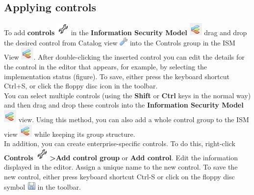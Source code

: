 \documentclass[a4paper,10pt]{book}
\begin{document}
\subsection{Applying controls}
To add \textbf{controls} \includegraphics[height=2ex]{Icon/Controls.png} in the \textbf{Information Security Model}
\includegraphics[height=2ex]{Icon/Informationssicherheitsmodell.png} drag and drop the desired control from Catalog view
\includegraphics[height=2ex]{Icon/Control_Kataloge.png} into the Controls group in the ISM View \includegraphics[height=2ex]{Icon/Informationssicherheitsmodell.png}.
After double-clicking the inserted control you can edit the details for the control in the editor that
appears, for example, by selecting the implementation status (figure). To save, either press the keyboard shortcut
Ctrl+S, or click the floppy disc icon in the toolbar.
\newline\\
You can select multiple controls (using the \textbf{Shift} or \textbf{Ctrl} keys in the normal way) and then drag and drop these controls into the
\textbf{Information Security Model} \includegraphics[height=2ex]{Icon/Informationssicherheitsmodell.png} view.
Using this method, you can also add a whole control group to the ISM view \includegraphics[height=2ex]{Icon/Informationssicherheitsmodell.png}
while keeping its group structure.
\newline\\
In addition, you can create enterprise-specific controls. To do this, right-click \textbf{Controls} \includegraphics[height=2ex]{Icon/Controls.png}
\textbf{\textgreater Add control group} or \textbf{Add control}. Edit the information displayed in the editor. Assign a unique name to the new control.
To save the new control, either press keyboard shortcut Ctrl-S or click on the floppy disc symbol
\includegraphics[height=2ex]{Icon/Disk.png} in the toolbar.
\end{document}
